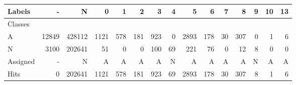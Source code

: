 \begin{tabular}{l|r|r|r|r|r|r|r|r|r|r|r|r|r|r}

Labels &      - &       N &     0 &    1 &    2 &    3 &   4 &     5 &    6 &   7 &    8 &  9 & 10 & 13 \\\hline
Classes  &        &         &       &      &      &      &     &       &      &     &      &    &    &    \\\hline
\hline
A        &  12849 &  428112 &  1121 &  578 &  181 &  923 &   0 &  2893 &  178 &  30 &  307 &  0 &  1 &  6 \\\hline
N        &   3100 &  202641 &    51 &    0 &    0 &  100 &  69 &   221 &   76 &   0 &   12 &  8 &  0 &  0 \\\hline
\hline
Assigned &      - &       N &     A &    A &    A &    A &   N &     A &    A &   A &    A &  N &  A &  A \\\hline
Hits     &      0 &  202641 &  1121 &  578 &  181 &  923 &  69 &  2893 &  178 &  30 &  307 &  8 &  1 &  6 
\end{tabular}
